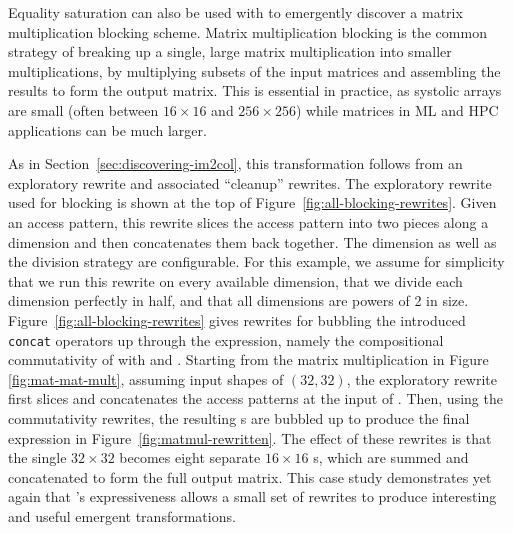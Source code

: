 Equality saturation 
  can also be used with \g 
  to emergently discover a
  matrix multiplication
  blocking scheme.
Matrix multiplication blocking
  is the common strategy
  of breaking up a single, large
  matrix multiplication
  into smaller multiplications,
  by multiplying subsets
  of the input matrices
  and assembling the results
  to form the output matrix.
This is essential in practice,
  as systolic arrays are small
  (often between $16\times16$ and $256\times256$)
  while matrices in ML and HPC applications
  can be much larger.

As in Section~\ref{sec:discovering-im2col},
  this transformation follows
  from an exploratory rewrite
  and associated ``cleanup'' rewrites.
The exploratory rewrite used for blocking
  is shown at the top of Figure~\ref{fig:all-blocking-rewrites}.
Given an access pattern,
  this rewrite slices the access pattern
  into two pieces
  along a dimension
  and then concatenates them back together.
The dimension
  as well as the division strategy
  are configurable.
For this example,
  we assume for simplicity
  that we run this rewrite
  on every available dimension,
  that we divide each dimension
  perfectly in half,
  and that all dimensions are powers of 2 in size.
Figure~\ref{fig:all-blocking-rewrites} gives rewrites
  for bubbling the introduced
  \texttt{concat}
  operators up through the expression,
  namely the compositional commutativity
  of 
  with 
  and .
Starting from the matrix multiplication
  in Figure \ref{fig:mat-mat-mult},
  assuming input shapes of $(32,32)$,
  the exploratory rewrite first slices and concatenates
  the access patterns
  at the input of .
Then, using the commutativity rewrites,
  the resulting s
  are bubbled up
  to produce the final expression
  in Figure~\ref{fig:matmul-rewritten}.
The effect of these rewrites
  is that the single 
  $32\times 32$ 
  becomes eight separate $16\times 16$ s,
  which are
  summed
  and concatenated
  to form the full output matrix.
This case study demonstrates
  yet again
  that \g's expressiveness
  allows a small set
  of rewrites
  to produce interesting and useful
  emergent transformations.
  
